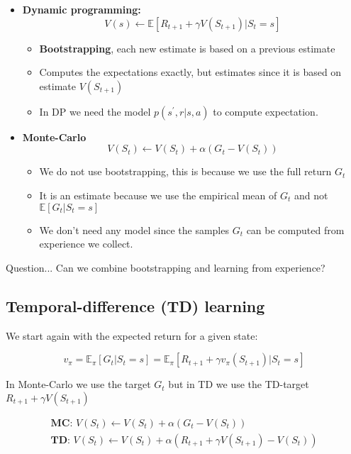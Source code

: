 \begin{itemize}
	\item \textbf{Dynamic programming: }
		\begin{equation}
			V(s) \leftarrow \mathbb{E}[R_{t+1} + \gamma V(S_{t+1}) |S_t = s]
		\end{equation}
		\begin{itemize}
			\item \textbf{Bootstrapping}, each new estimate is based on a previous estimate
			\item Computes the expectations exactly, but estimates since it is based on estimate $V(S_{t+1})$ 
			\item In DP we need the model $p(s^{\prime},r|s,a)$ to compute expectation. 
		\end{itemize}
	\item \textbf{Monte-Carlo}
		\begin{equation}
			V(S_t) \leftarrow V(S_t) + \alpha(G_t - V(S_t))
		\end{equation}
		\begin{itemize}
			\item We do not use bootstrapping, this is because we use the full return $G_t$
			\item It is an estimate because we use the empirical mean of $G_t$ and not $\mathbb{E}[G_t |S_t = s	]$
			\item We don't need any model since the samples $G_t$ can be computed from experience we collect.
		\end{itemize}
\end{itemize}

Question... Can we combine bootstrapping and learning from experience?

\subsection*{Temporal-difference (TD) learning}

We start again with the expected return for a given state:

	\begin{equation}
		v_\pi = \mathbb{E}_\pi [G_t | S_t = s] = \mathbb{E}_\pi[R_{t+1} + \gamma v_\pi(S_{t+1})|S_t = s]
	\end{equation}

In Monte-Carlo we use the target $G_t$ but in TD we use the TD-target $R_{t+1} + \gamma V(S_{t+1})$

	\begin{equation}
	\begin{aligned}
		\textbf{MC: } V(S_t) \leftarrow V(S_t) + \alpha (G_t - V(S_t)) \\
		\textbf{TD: } V(S_t) \leftarrow V(S_t) + \alpha (R_{t+1} + \gamma V(S_{t+1}) - V(S_t))
	\end{aligned}
	\end{equation}

